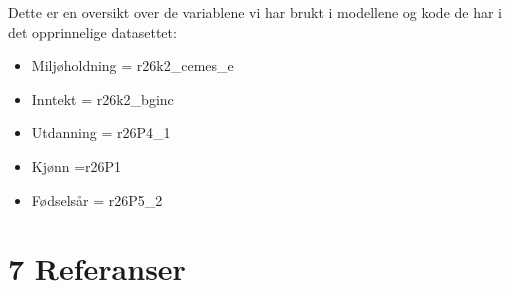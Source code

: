 \documentclass[
  12pt,
  letterpaper,
  DIV=11,
  numbers=noendperiod]{scrartcl}
\begin{document}
Dette er en oversikt over de variablene vi har brukt i modellene og kode
de har i det opprinnelige datasettet:

\begin{itemize}
\item
  Miljøholdning = r26k2\_cemes\_e
\item
  Inntekt = r26k2\_bginc
\item
  Utdanning = r26P4\_1
\item
  Kjønn =r26P1
\item
  Fødselsår = r26P5\_2
\end{itemize}

\hypertarget{referanser}{%
\section*{7 Referanser}\label{referanser}}
\end{document}
